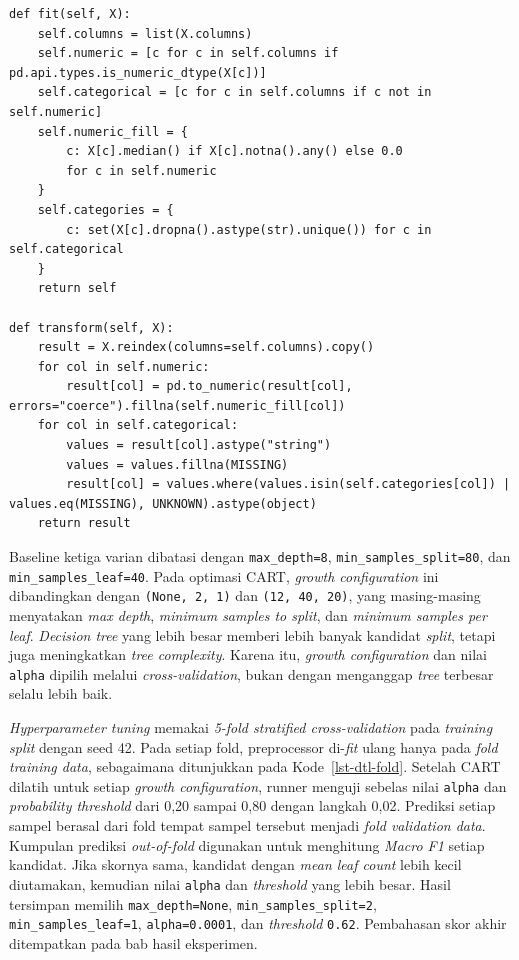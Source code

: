 \begin{lstlisting}[caption={Median imputation dan categorical handling pada preprocessing DTL},label={lst-dtl-preprocessing}]
def fit(self, X):
    self.columns = list(X.columns)
    self.numeric = [c for c in self.columns if pd.api.types.is_numeric_dtype(X[c])]
    self.categorical = [c for c in self.columns if c not in self.numeric]
    self.numeric_fill = {
        c: X[c].median() if X[c].notna().any() else 0.0
        for c in self.numeric
    }
    self.categories = {
        c: set(X[c].dropna().astype(str).unique()) for c in self.categorical
    }
    return self

def transform(self, X):
    result = X.reindex(columns=self.columns).copy()
    for col in self.numeric:
        result[col] = pd.to_numeric(result[col], errors="coerce").fillna(self.numeric_fill[col])
    for col in self.categorical:
        values = result[col].astype("string")
        values = values.fillna(MISSING)
        result[col] = values.where(values.isin(self.categories[col]) | values.eq(MISSING), UNKNOWN).astype(object)
    return result
\end{lstlisting}

Baseline ketiga varian dibatasi dengan \texttt{max\_depth=8}, \texttt{min\_samples\_split=80}, dan \texttt{min\_samples\_leaf=40}. Pada optimasi CART, \textit{growth configuration} ini dibandingkan dengan \texttt{(None, 2, 1)} dan \texttt{(12, 40, 20)}, yang masing-masing menyatakan \textit{max depth}, \textit{minimum samples to split}, dan \textit{minimum samples per leaf}. \textit{Decision tree} yang lebih besar memberi lebih banyak kandidat \textit{split}, tetapi juga meningkatkan \textit{tree complexity}. Karena itu, \textit{growth configuration} dan nilai \texttt{alpha} dipilih melalui \textit{cross-validation}, bukan dengan menganggap \textit{tree} terbesar selalu lebih baik.

\textit{Hyperparameter tuning} memakai \textit{5-fold stratified cross-validation} pada \textit{training split} dengan seed 42. Pada setiap fold, preprocessor di-\textit{fit} ulang hanya pada \textit{fold training data}, sebagaimana ditunjukkan pada Kode~\ref{lst-dtl-fold}. Setelah CART dilatih untuk setiap \textit{growth configuration}, runner menguji sebelas nilai \texttt{alpha} dan \textit{probability threshold} dari 0,20 sampai 0,80 dengan langkah 0,02. Prediksi setiap sampel berasal dari fold tempat sampel tersebut menjadi \textit{fold validation data}. Kumpulan prediksi \textit{out-of-fold} digunakan untuk menghitung \textit{Macro F1} setiap kandidat. Jika skornya sama, kandidat dengan \textit{mean leaf count} lebih kecil diutamakan, kemudian nilai \texttt{alpha} dan \textit{threshold} yang lebih besar. Hasil tersimpan memilih \texttt{max\_depth=None}, \texttt{min\_samples\_split=2}, \texttt{min\_samples\_leaf=1}, \texttt{alpha=0.0001}, dan \textit{threshold} \texttt{0.62}. Pembahasan skor akhir ditempatkan pada bab hasil eksperimen.

